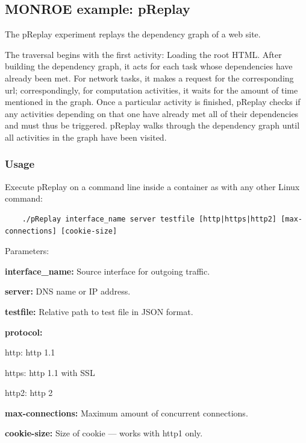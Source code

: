 \documentclass[a4paper,10pt]{article}
\newcommand{\VerbatimFont}{\footnotesize}
\newcommand{\monroe}{MONROE}
\begin{document}
\subsection{\monroe{} example: pReplay}

The pReplay experiment replays the dependency graph of a web site.

The traversal begins with the first activity: Loading the root HTML.
After building the dependency graph, it acts for each task whose dependencies have already been met.
For network tasks, it makes a request for the corresponding url; correspondingly, for computation activities, it waits for the amount of time mentioned in the graph.
Once a particular activity is finished, pReplay checks if any activities depending on that one have already met all of their dependencies and must thus be triggered.
pReplay walks through the dependency graph until all activities in the graph have been visited.

\subsubsection{Usage}

Execute pReplay on a command line inside a container as with any other Linux command:
{\VerbatimFont
	\begin{verbatim}
	./pReplay interface_name server testfile [http|https|http2] [max-connections] [cookie-size]
	\end{verbatim}}

\noindent Parameters:
\begin{itemize*}
	\item \textbf{interface\_name:} Source interface for outgoing traffic.
	\item \textbf{server:} DNS name or IP address.
	\item \textbf{testfile:} Relative path to test file in JSON format.
	\item \textbf{protocol:}
	\begin{itemize*}
		\item http: http 1.1
		\item https: http 1.1 with SSL
		\item http2: http 2
	\end{itemize*}
	\item \textbf{max-connections:} Maximum amount of concurrent connections.
	\item \textbf{cookie-size:} Size of cookie --- works with http1 only.
\end{itemize*}
\end{document}
